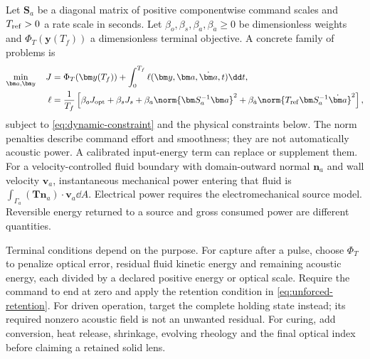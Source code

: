 Let $\bm S_a$ be a diagonal matrix of positive componentwise command scales
and $T_{\rm ref}>0$ a rate scale in seconds. Let
$\beta_o,\beta_s,\beta_a,\beta_{\dot a}\geq0$ be dimensionless weights and
$\Phi_T(\bm y(T_f))$ a dimensionless terminal objective. A concrete family of
problems is
\begin{align}
 \min_{\bm a,\bm y}\quad
 J&=\Phi_T(\bm y(T_f))
    +\int_0^{T_f}\ell(\bm y,\bm a,\dot{\bm a},t)\dd t,
 \label{eq:dynamic-objective}\\
 \ell&=\frac{1}{T_f}\left[
 \beta_oJ_{\rm opt}+\beta_sJ_s
 +\beta_a\norm{\bm S_a^{-1}\bm a}^2
 +\beta_{\dot a}\norm{T_{\rm ref}\bm S_a^{-1}\dot{\bm a}}^2\right],
 \label{eq:running-cost}
\end{align}
subject to \cref{eq:dynamic-constraint} and the physical constraints below.
The norm penalties describe command effort and smoothness; they are not
automatically acoustic power. A calibrated input-energy term can replace or
supplement them. For a velocity-controlled fluid boundary with domain-outward
normal $\bm n_a$ and wall velocity $\bm v_a$, instantaneous mechanical power
entering that fluid is
$\int_{\Gamma_a}(\bm T\bm n_a)\cdot\bm v_a\dd A$. Electrical power requires
the electromechanical source model. Reversible energy returned to a source and
gross consumed power are different quantities.

Terminal conditions depend on the purpose. For capture after a pulse, choose
$\Phi_T$ to penalize optical error, residual fluid kinetic energy and remaining
acoustic energy, each divided by a declared positive energy or optical scale.
Require the command to end at zero and apply the retention condition in
\cref{eq:unforced-retention}. For driven operation, target the complete holding
state instead; its required nonzero acoustic field is not an unwanted residual.
For curing, add conversion, heat release, shrinkage, evolving rheology and the
final optical index before claiming a retained solid lens.


